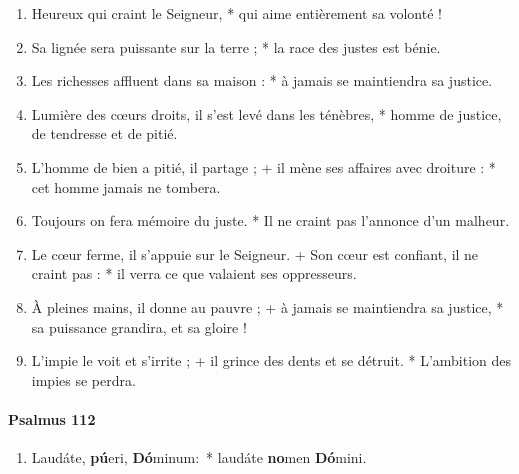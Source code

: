 \documentclass[twoside]{article}
\begin{document}
\begin{paracol}[1]{2}
\begin{enumerate}[wide, itemsep=0mm, labelwidth=!, labelindent=0pt, label=\color{gregoriocolor}\theenumi]
\item Heureux qui craint le Seigneur, *
qui aime entièrement sa volonté !
\item Sa lignée sera puissante sur la terre ; *
la race des justes est bénie.
\item Les richesses affluent dans sa maison : *
à jamais se maintiendra sa justice.
\item Lumière des cœurs droits, il s'est levé dans les ténèbres, *
homme de justice, de tendresse et de pitié.
\item L'homme de bien a pitié, il partage ; +
il mène ses affaires avec droiture : *
cet homme jamais ne tombera.
\item Toujours on fera mémoire du juste. *
Il ne craint pas l'annonce d'un malheur.
\item Le cœur ferme, il s'appuie sur le Seigneur. +
Son cœur est confiant, il ne craint pas : *
il verra ce que valaient ses oppresseurs.
\item À pleines mains, il donne au pauvre ; +
à jamais se maintiendra sa justice, *
sa puissance grandira, et sa gloire !
\item L'impie le voit et s'irrite ; +
il grince des dents et se détruit. *
L'ambition des impies se perdra.
\end{enumerate}

\switchcolumn*
\paragraph{Psalmus 112}



\begin{enumerate}[wide, itemsep=0mm, labelwidth=!, labelindent=0pt, label=\color{gregoriocolor}\theenumi]
\item Laudáte, \textbf{pú}eri, \textbf{Dó}minum:~* laudáte \textbf{no}men \textbf{Dó}mini.


\end{enumerate}
\end{paracol}
\end{document}
